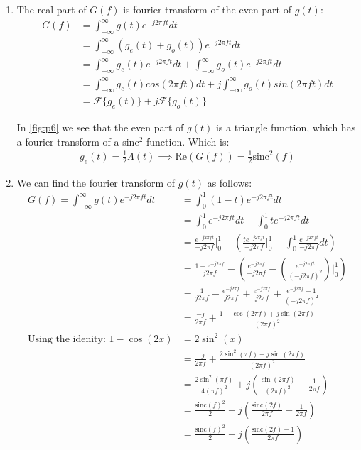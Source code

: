 \documentclass{article}
\begin{document}
\begin{enumerate}[label=6.\arabic*]
    \item The real part of $G(f)$ is fourier transform of the even part of $g(t)$:
    \begin{align*}
        G(f) &= \int_{-\infty}^{\infty} g(t)e^{-j2\pi ft} dt \\
        &= \int_{-\infty}^{\infty} (g_e(t) + g_o(t))e^{-j2\pi ft} dt \\
        &= \int_{-\infty}^{\infty} g_e(t)e^{-j2\pi ft} dt + \int_{-\infty}^{\infty} g_o(t)e^{-j2\pi ft} dt \\
        &= \int_{-\infty}^{\infty} g_e(t) cos(2\pi ft) dt + j\int_{-\infty}^{\infty} g_o(t)sin(2\pi ft) dt \\
        &= \mathcal{F}\{g_e(t)\} + j\mathcal{F}\{g_o(t)\}
    \end{align*}

    In \autoref{fig:p6} we see that the even part of $g(t)$ is a triangle function, which has a fourier transform of a sinc$^2$ function. Which is:
    \begin{align*}
        g_e(t) = \frac{1}{2} \Lambda(t) \implies \text{Re}(G(f)) = \frac{1}{2} \text{sinc}^2(f)
    \end{align*}

    \item We can find the fourier transform of $g(t)$ as follows:
    \begin{align*}
        G(f) = \int_{-\infty}^{\infty} g(t)e^{-j2\pi ft}dt &= \int_{0}^{1}(1-t)e^{-j2\pi ft}dt \\
        &= \int_{0}^{1} e^{-j2\pi ft}dt - \int_{0}^{1} te^{-j2\pi ft}dt \\
        &= \frac{e^{-j2\pi f t}}{-j 2\pi f} \Bigg|_{0}^{1} - \left(\frac{te^{-j2\pi f t}}{-j2\pi f} \Bigg|_{0}^{1} - \int_{0}^{1} \frac{e^{-j2\pi f t}}{-j2\pi f}dt\right) \\
        &= \frac{1-e^{-j2\pi f}}{j2\pi f} - \left(\frac{e^{-j2\pi f}}{-j2\pi f}
        - \left(\frac{e^{-j2\pi f t}}{(-j2\pi f)^2}\right) \Bigg|_{0}^{1}\right) \\
        &= \frac{1}{j2\pi f} - \frac{e^{-j2\pi f}}{j2\pi f} + \frac{e^{-j2\pi f}}{j2\pi f} + \frac{e^{-j2\pi f} - 1}{(-j2\pi f)^2} \\
        &= \frac{-j}{2\pi f} + \frac{1-\cos(2\pi f) + j \sin (2\pi f)}{(2\pi f)^2} \\
    \text{Using the idenity: } 1-\cos(2x) &= 2\sin^2(x) \\
        &= \frac{-j}{2\pi f} + \frac{2\sin^2(\pi f) + j\sin(2\pi f)}{(2\pi f)^2} \\
        &= \frac{2\sin^2(\pi f)}{4(\pi f)^2}+ j\left(\frac{\sin(2\pi f)}{(2\pi f)^2} - \frac{1}{2\pi f}\right) \\
        &= \frac{\text{sinc}(f)^2}{2} + j\left(\frac{\text{sinc}(2f)}{2\pi f} - \frac{1}{2\pi f}\right) \\
        &= \boxed{\frac{\text{sinc}(f)^2}{2} + j\left(\frac{\text{sinc}(2f) - 1}{2\pi f}\right)}
    \end{align*}


\end{enumerate}
\end{document}
